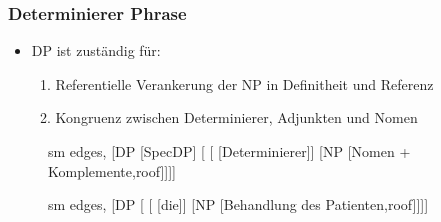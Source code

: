 \begin{frame}
\frametitle{Determinierer Phrase}

	\begin{itemize}
		\item DP ist zuständig für:
		\begin{enumerate}
			\item Referentielle Verankerung der NP in Definitheit und Referenz
			\item Kongruenz zwischen Determinierer, Adjunkten und Nomen
		\end{enumerate}				
	\end{itemize}


\begin{figure}[b]
  	\begin{minipage}[b]{0.45\textwidth}
	\centering
	\footnotesize{
		\begin{forest}
		sm edges,
		[DP [SpecDP]
			[ 	[ [Determinierer]]
						[NP [Nomen + Komplemente,roof]]]]
		\end{forest}
		}
  	\end{minipage}  
 	\pause            
	\begin{minipage}[b]{0.45\textwidth}
	\centering
	\footnotesize{
		\begin{forest}
		sm edges,
		[DP [ 	[ [die]]
						[NP [Behandlung des Patienten,roof]]]]
		\end{forest}
		}
  	\end{minipage}  
\end{figure}

\end{frame}


